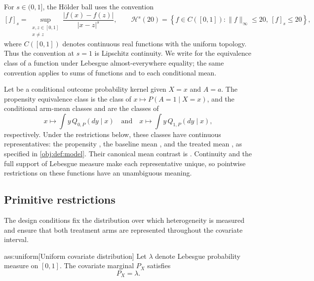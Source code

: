 For \(s\in(0,1]\), the Hölder ball  uses the convention
\[
[f]_s
=
\sup_{\substack{x,z\in[0,1]\\x\ne z}}
\frac{|f(x)-f(z)|}{|x-z|^s},
\qquad
\mathcal H^s(20)
=
\left\{
f\in C([0,1]):
\|f\|_\infty\le20,\ [f]_s\le20
\right\},
\]
where \(C([0,1])\) denotes continuous real functions with the uniform topology. Thus the convention at \(s=1\) is Lipschitz continuity. We write  for the equivalence class of a function under Lebesgue almost-everywhere equality; the same convention applies to sums of functions and to each conditional mean.

Let  be a conditional outcome probability kernel given \(X=x\) and \(A=a\). The propensity equivalence class  is the class of \(x\mapsto P(A=1\mid X=x)\), and the conditional arm-mean classes  and  are the classes of
\[
x\longmapsto \int y\,Q_{0,P}(dy\mid x)
\quad\text{and}\quad
x\longmapsto \int y\,Q_{1,P}(dy\mid x),
\]
respectively. Under the restrictions below, these classes have continuous representatives: the propensity , the baseline mean , and the treated mean , as specified in \cref{obj:def:model}. Their canonical mean contrast is . Continuity and the full support of Lebesgue measure make each representative unique, so pointwise restrictions on these functions have an unambiguous meaning.

\subsection{Primitive restrictions}

The design conditions fix the distribution over which heterogeneity is measured and ensure that both treatment arms are represented throughout the covariate interval.

\begin{assumptionv}{ass:uniform}[Uniform covariate distribution]
Let \(\lambda\) denote Lebesgue probability measure on \([0,1]\). The covariate marginal \(P_X\) satisfies
\[
P_X=\lambda.
\]
\end{assumptionv}

